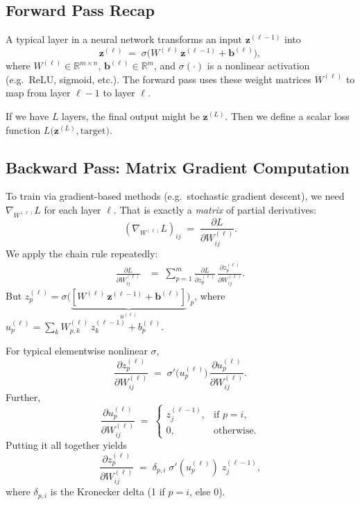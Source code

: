 \documentclass[11pt]{article}
\newcommand{\R}{\mathbb{R}}
\begin{document}
\subsection{Forward Pass Recap}
A typical layer in a neural network transforms an input $\mathbf{z}^{(\ell-1)}$ into 
\[
\mathbf{z}^{(\ell)} 
\;=\; 
\sigma\!\bigl(W^{(\ell)} \,\mathbf{z}^{(\ell-1)} + \mathbf{b}^{(\ell)}\bigr),
\]
where $W^{(\ell)} \in \R^{m \times n}$, $\mathbf{b}^{(\ell)} \in \R^m$, 
and $\sigma(\cdot)$ is a nonlinear activation (e.g.\ ReLU, sigmoid, etc.). 
The forward pass uses these weight matrices $W^{(\ell)}$ to map from layer $\ell - 1$ to layer $\ell$.

If we have $L$ layers, the final output might be $\mathbf{z}^{(L)}$. 
Then we define a scalar loss function $L\bigl(\mathbf{z}^{(L)}, \text{target}\bigr)$.

\subsection{Backward Pass: Matrix Gradient Computation}
To train via gradient-based methods (e.g.\ stochastic gradient descent), 
we need $\nabla_{W^{(\ell)}} L$ for each layer $\ell$. 
That is exactly a \emph{matrix} of partial derivatives:
\[
(\nabla_{W^{(\ell)}} L)_{ij}
\;=\;
\frac{\partial L}{\partial W^{(\ell)}_{ij}}.
\]
We apply the chain rule repeatedly:
\begin{align*}
\frac{\partial L}{\partial W^{(\ell)}_{ij}}
&=\;
\sum_{p=1}^m
\frac{\partial L}{\partial z^{(\ell)}_{p}} \,
\frac{\partial z^{(\ell)}_{p}}{\partial W^{(\ell)}_{ij}}.
\end{align*}
But $z^{(\ell)}_p = \sigma\bigl(\underbrace{[W^{(\ell)} \,\mathbf{z}^{(\ell-1)} + \mathbf{b}^{(\ell)}]}_{u^{(\ell)}}\bigr)_p$, 
where $u^{(\ell)}_p = \sum_k W^{(\ell)}_{p,k}\,z^{(\ell-1)}_k + b^{(\ell)}_p$. 

For typical elementwise nonlinear $\sigma$, 
\[
\frac{\partial z^{(\ell)}_{p}}{\partial W^{(\ell)}_{ij}}
\;=\;
\sigma'\bigl(u^{(\ell)}_p\bigr)\,
\frac{\partial u^{(\ell)}_p}{\partial W^{(\ell)}_{ij}}.
\]
Further, 
\[
\frac{\partial u^{(\ell)}_p}{\partial W^{(\ell)}_{ij}}
\;=\;
\begin{cases}
z^{(\ell-1)}_j, &\text{if }p = i,\\
0, &\text{otherwise}.
\end{cases}
\]
Putting it all together yields
\[
\frac{\partial z^{(\ell)}_{p}}{\partial W^{(\ell)}_{ij}}
\;=\;
\delta_{p,i}\;\sigma'(u^{(\ell)}_p)\;z^{(\ell-1)}_j,
\]
where $\delta_{p,i}$ is the Kronecker delta (1 if $p=i$, else 0). 
\end{document}
